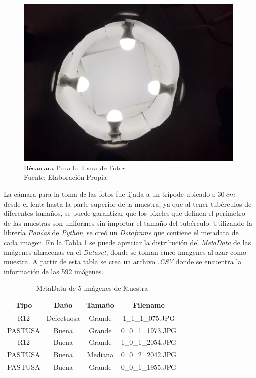 \newpage
\begin{figure}[ht]
	\centering
	\includegraphics[scale=0.16]{Figs/Chamber.JPEG}
	\caption{Récamara Para la Toma de Fotos\\ Fuente: Elaboración Propia}
	\label{fig:chamber}
\end{figure}


La cámara para la toma de las fotos fue fijada a un trípode ubicado a $30 \ cm$ desde el lente hasta la parte superior de la muestra, ya que al tener tubérculos de diferentes tamaños, se puede garantizar que los píxeles que definen el perímetro de las muestras son uniformes sin importar el tamaño del tubérculo. Utilizando la librería \textit{Pandas} de \textit{Python}, se creó un \textit{Dataframe} que contiene el metadata de cada imagen. En la Tabla \ref{table:metadata} se puede apreciar la distribución del \textit{MetaData} de las imágenes almacenas en el \textit{Dataset}, donde se toman cinco imagenes al azar como muestra. A partir de esta tabla se crea un archivo \textit{.CSV} donde se encuentra la información de las 592 imágenes.\\

\begin{table}[ht]
	\centering
	\begin{tabular}{|c|c|c|c|}
		\hline
		Tipo & Daño & Tamaño & Filename \\
		\hline
		R12 & Defectuosa & Grande & 1\_1\_1\_075.JPG \\
		\hline
		PASTUSA & Buena & Grande & 0\_0\_1\_1973.JPG \\
		\hline
		R12 & Buena & Grande & 1\_0\_1\_2054.JPG \\
		\hline
		PASTUSA & Buena & Mediana & 0\_0\_2\_2042.JPG \\
		\hline
		PASTUSA & Buena & Grande & 0\_0\_1\_1955.JPG \\
		\hline
	\end{tabular}	
	\caption{MetaData de 5 Imágenes de Muestra}
	\label{table:metadata}
\end{table}


